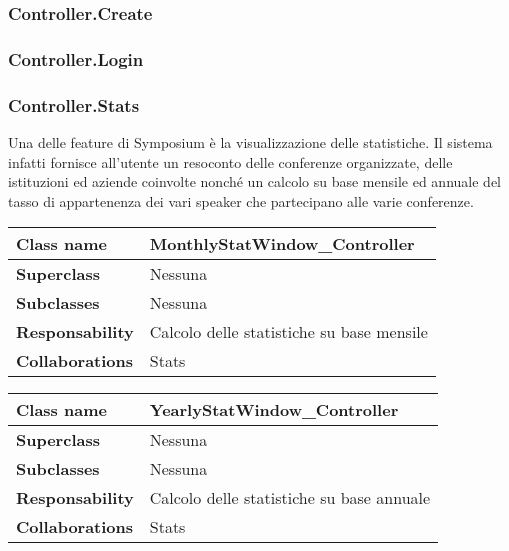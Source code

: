 \newpage
\subsubsection{Controller.Create}

\subsubsection{Controller.Login}

\subsubsection{Controller.Stats}
Una delle feature di Symposium è la visualizzazione delle statistiche. Il sistema infatti fornisce all'utente un resoconto delle conferenze organizzate, delle istituzioni ed aziende coinvolte nonché un calcolo su base mensile ed annuale del tasso di appartenenza dei vari speaker che partecipano alle varie conferenze.
\begin{table}[h!]
	\begin{tabular}{|l|l|}
		\hline 
		\textbf{Class name} & MonthlyStatWindow\_Controller
		\\ \hline
		\textbf{Superclass} & Nessuna
		\\ \hline
		\multirow{1}{*}{\textbf{Subclasses}} & Nessuna
		\\ \hline
		\textbf{Responsability} & Calcolo delle statistiche su base mensile
		\\ \hline
		\multirow{1}{*}{\textbf{Collaborations}} & Stats \\ \hline
	\end{tabular}
\end{table}
\begin{table}[h!]
	\begin{tabular}{|l|l|}
		\hline 
		\textbf{Class name} & YearlyStatWindow\_Controller
		\\ \hline
		\textbf{Superclass} & Nessuna
		\\ \hline
		\multirow{1}{*}{\textbf{Subclasses}} & Nessuna
		\\ \hline
		\textbf{Responsability} & Calcolo delle statistiche su base annuale
		\\ \hline
		\multirow{1}{*}{\textbf{Collaborations}} & Stats \\ \hline
	\end{tabular}
\end{table}
